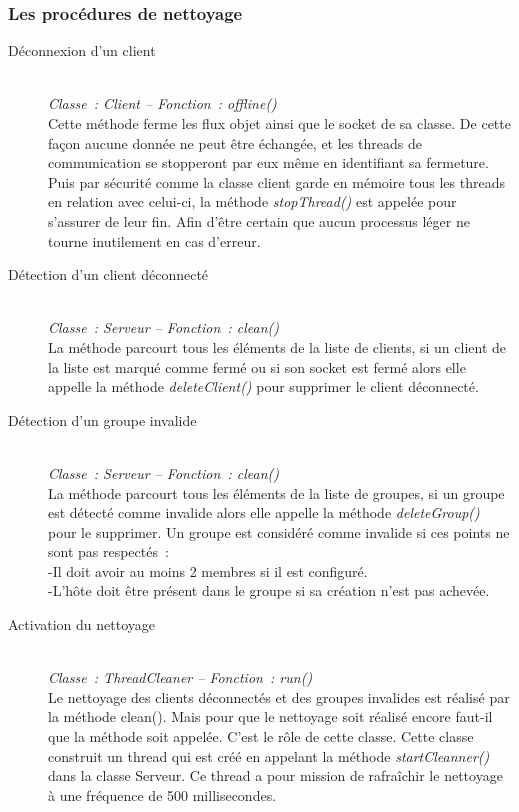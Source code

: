 \documentclass[a4paper, titlepage]{livret}
\begin{document}
\subsubsection{Les procédures de nettoyage}
\begin{description}
  \item[Déconnexion d’un client]
  \textit{\\Classe : Client – Fonction : offline()\\}
Cette méthode ferme les flux objet ainsi que le socket de sa classe. De cette façon aucune donnée ne peut être échangée, et les threads de communication se stopperont par eux même en identifiant sa fermeture.
Puis par sécurité comme la classe client garde en mémoire tous les threads en relation avec celui-ci, la méthode \textit{stopThread()} est appelée pour s’assurer de leur fin. Afin d’être certain que aucun processus léger ne tourne inutilement en cas d’erreur.
  
  \item[Détection d’un client déconnecté]
  \textit{\\Classe : Serveur – Fonction : clean()\\}
  La méthode parcourt tous les éléments de la liste de clients, si un client de la liste est marqué comme fermé ou si son socket est fermé alors elle appelle la méthode \textit{deleteClient()} pour supprimer le client déconnecté.
  
  \item[Détection d’un groupe invalide]
  \textit{\\Classe : Serveur – Fonction : clean()\\}
  La méthode parcourt tous les éléments de la liste de groupes, si un groupe est détecté comme invalide alors elle appelle la méthode \textit{deleteGroup()} pour le supprimer.
Un groupe est considéré comme invalide si ces points ne sont pas respectés :\\
-Il doit avoir au moins 2 membres si il est configuré.\\
-L’hôte doit être présent dans le groupe si sa création n’est pas achevée.

  \item[Activation du nettoyage]
  \textit{\\Classe : ThreadCleaner – Fonction : run()\\}
  Le nettoyage des clients déconnectés et des groupes invalides est réalisé par la méthode clean(). Mais pour que le nettoyage soit réalisé encore faut-il que la méthode soit appelée. C’est le rôle de cette classe. Cette classe construit un thread qui est créé en appelant la méthode \textit{startCleanner()} dans la classe Serveur. Ce thread a pour mission de rafraîchir le nettoyage à une fréquence de 500 millisecondes.
  
  \end{description}
  
\end{document}
